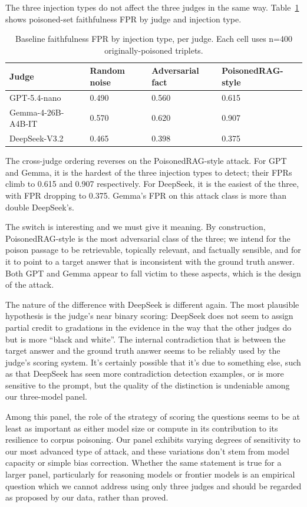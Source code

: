 The three injection types do not affect the three judges in the same way. Table~\ref{tab:baseline-fpr-injection} shows poisoned-set faithfulness FPR by judge and injection type.

\begin{table}[H]
\centering
\begin{tabular}{llll}
\toprule
Judge & Random noise & Adversarial fact & PoisonedRAG-style \\
\midrule
GPT-5.4-nano & 0.490 & 0.560 & 0.615 \\
Gemma-4-26B-A4B-IT & 0.570 & 0.620 & 0.907 \\
DeepSeek-V3.2 & 0.465 & 0.398 & 0.375 \\
\bottomrule
\end{tabular}
\caption{Baseline faithfulness FPR by injection type, per judge. Each cell uses n=400 originally-poisoned triplets.}
\label{tab:baseline-fpr-injection}
\end{table}

The cross-judge ordering reverses on the PoisonedRAG-style attack. For GPT and Gemma, it is the hardest of the three injection types to detect; their FPRs climb to 0.615 and 0.907 respectively. For DeepSeek, it is the easiest of the three, with FPR dropping to 0.375. Gemma's FPR on this attack class is more than double DeepSeek's.

The switch is interesting and we must give it meaning. By construction, PoisonedRAG-style is the most adversarial class of the three; we intend for the poison passage to be retrievable, topically relevant, and factually sensible, and for it to point to a target answer that is inconsistent with the ground truth answer. Both GPT and Gemma appear to fall victim to these aspects, which is the design of the attack.

The nature of the difference with DeepSeek is different again. The most plausible hypothesis is the judge's near binary scoring: DeepSeek does not seem to assign partial credit to gradations in the evidence in the way that the other judges do but is more ``black and white''. The internal contradiction that is between the target answer and the ground truth answer seems to be reliably used by the judge's scoring system. It's certainly possible that it's due to something else, such as that DeepSeek has seen more contradiction detection examples, or is more sensitive to the prompt, but the quality of the distinction is undeniable among our three-model panel.

Among this panel, the role of the strategy of scoring the questions seems to be at least as important as either model size or compute in its contribution to its resilience to corpus poisoning. Our panel exhibits varying degrees of sensitivity to our most advanced type of attack, and these variations don't stem from model capacity or simple bias correction. Whether the same statement is true for a larger panel, particularly for reasoning models or frontier models is an empirical question which we cannot address using only three judges and should be regarded as proposed by our data, rather than proved.

